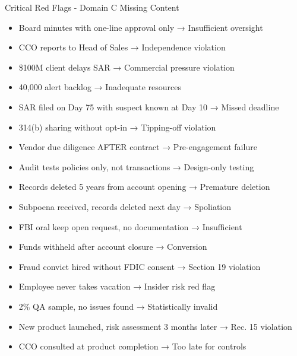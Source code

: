 \documentclass[11pt,a4paper]{beamer}
\begin{document}
\begin{frame}{Critical Red Flags - Domain C Missing Content}
\begin{itemize}
\item Board minutes with one-line approval only → Insufficient oversight
\item CCO reports to Head of Sales → Independence violation
\item \$100M client delays SAR → Commercial pressure violation
\item 40,000 alert backlog → Inadequate resources
\item SAR filed on Day 75 with suspect known at Day 10 → Missed deadline
\item 314(b) sharing without opt-in → Tipping-off violation
\item Vendor due diligence AFTER contract → Pre-engagement failure
\item Audit tests policies only, not transactions → Design-only testing
\item Records deleted 5 years from account opening → Premature deletion
\item Subpoena received, records deleted next day → Spoliation
\item FBI oral keep open request, no documentation → Insufficient
\item Funds withheld after account closure → Conversion
\item Fraud convict hired without FDIC consent → Section 19 violation
\item Employee never takes vacation → Insider risk red flag
\item 2\% QA sample, no issues found → Statistically invalid
\item New product launched, risk assessment 3 months later → Rec. 15 violation
\item CCO consulted at product completion → Too late for controls
\end{itemize}
\end{frame}
\end{document}
